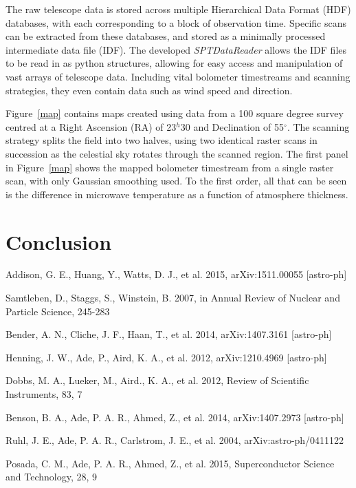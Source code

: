 \documentclass[iop]{emulateapj}
\begin{document}
The raw telescope data is stored across multiple Hierarchical Data Format (HDF) databases, with each corresponding to a block of observation time.  Specific scans can be extracted from these databases, and stored as a minimally processed intermediate data file (IDF).  The developed \textit{SPTDataReader} allows the IDF files to be read in as python structures, allowing for easy access and manipulation of vast arrays of telescope data.  Including vital bolometer timestreams and scanning strategies, they even contain data such as wind speed and direction.

Figure~\ref{map} contains maps created using data from a 100 square degree survey centred at a Right Ascension (RA) of 23$^h$30 and Declination of 55$^{\circ}$.  The scanning strategy splits the field into two halves, using two identical raster scans in succession as the celestial sky rotates through the scanned region.  The first panel in Figure~\ref{map} shows the mapped bolometer timestream from a single raster scan, with only Gaussian smoothing used.  To the first order, all that can be seen is the difference in microwave temperature as a function of atmosphere thickness.



\section{Conclusion}

%
\begin{thebibliography}{dummy}
Addison, G. E., Huang, Y., Watts, D. J., et al. 2015, {arXiv:1511.00055 [astro-ph]}

Samtleben, D., Staggs, S., Winstein, B. 2007, in Annual Review of Nuclear and Particle Science, 245-283

Bender, A. N., Cliche, J. F., Haan, T., et al. 2014, {arXiv:1407.3161 [astro-ph]}

Henning, J. W., Ade, P., Aird, K. A., et al. 2012, {arXiv:1210.4969 [astro-ph]}

Dobbs, M. A., Lueker, M., Aird., K. A., et al. 2012, Review of Scientific Instruments, 83, 7

Benson, B. A., Ade, P. A. R., Ahmed, Z., et al. 2014, {arXiv:1407.2973 [astro-ph]}

Ruhl, J. E., Ade, P. A. R., Carlstrom, J. E., et al. 2004, {arXiv:astro-ph/0411122}

Posada, C. M., Ade, P. A. R., Ahmed, Z., et al. 2015, Superconductor Science and Technology, 28, 9

\end{thebibliography}
\end{document}
